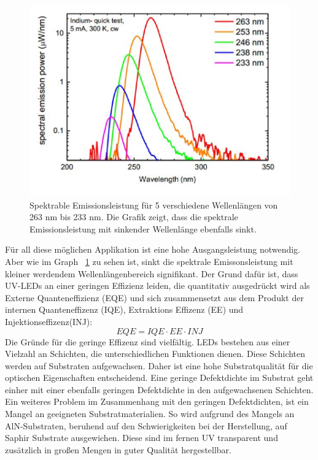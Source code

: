\begin{figure}[htb]
    \centering
    \begin{minipage}[t]{0.49\linewidth}
        \centering
        \includegraphics[width=\linewidth]{Bilder/SpectralEmissionPower_Wavelength.png}
        \caption{Spektrable Emissionsleistung für 5 verschiedene Wellenlängen von 263 nm bis 233 nm. Die Grafik zeigt, dass die spektrale Emissionsleistung mit sinkender Wellenlänge ebenfalls sinkt\cite{semreich}.}
        \label{fig:specPowWVL}
    \end{minipage}
\end{figure}
\vspace{1cm}
\newline
Für all diese möglichen Applikation ist eine hohe Ausgangsleistung notwendig. Aber wie im Graph ~\ref{fig:specPowWVL} zu sehen ist, sinkt die spektrale Emissonsleistung mit kleiner werdendem Wellenlängenbereich signifikant. Der Grund dafür ist, dass UV-LEDs an einer geringen Effizienz leiden, die quantitativ ausgedrückt wird als Externe Quanteneffizienz (EQE) und sich zusammensetzt aus dem Produkt der internen Quanteneffizenz (IQE), Extraktions Effizenz (EE) und Injektionseffizenz(INJ):
%
\begin{equation}
    EQE = IQE \cdot EE \cdot INJ
\end{equation}
%
Die Gründe für die geringe Effizenz sind vielfältig. LEDs bestehen aus einer Vielzahl an Schichten, die unterschiedlichen Funktionen dienen. Diese Schichten werden auf Substraten aufgewachsen. Daher ist eine hohe Substratqualität für die optischen Eigenschaften entscheidend. Eine geringe Defektdichte im Substrat geht einher mit einer ebenfalls geringen Defektdichte in den aufgewachsenen Schichten. Ein weiteres Problem im Zusammenhang mit den geringen Defektdichten, ist ein Mangel an geeigneten Substratmaterialien. So wird aufgrund des Mangels an AlN-Substraten, beruhend auf den Schwierigkeiten bei der Herstellung, auf Saphir Substrate ausgewichen. Diese sind im fernen UV transparent und zusätzlich in großen Mengen in guter Qualität hergestellbar.
